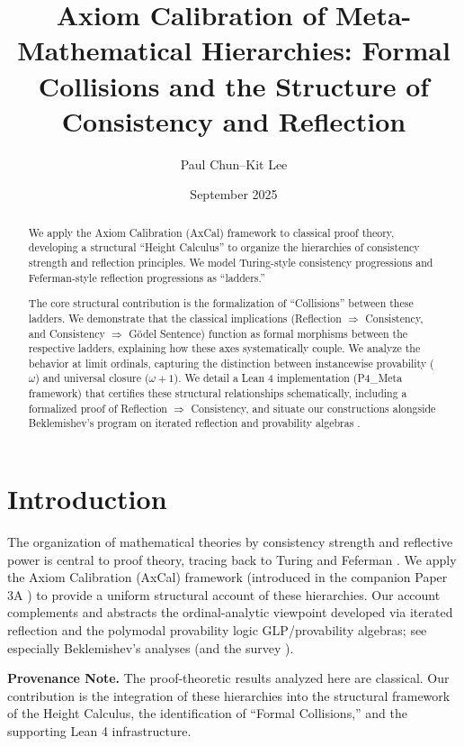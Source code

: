 \documentclass[11pt]{article}
\title{Axiom Calibration of Meta-Mathematical Hierarchies: Formal Collisions and the Structure of Consistency and Reflection}
\author{Paul Chun--Kit Lee}
\date{September 2025}
\begin{document}
\maketitle

\begin{abstract}
We apply the Axiom Calibration (AxCal) framework to classical proof theory, developing a structural ``Height Calculus'' to organize the hierarchies of consistency strength and reflection principles. We model Turing-style consistency progressions and Feferman-style reflection progressions as ``ladders.''

The core structural contribution is the formalization of ``Collisions'' between these ladders. We demonstrate that the classical implications (Reflection $\Rightarrow$ Consistency, and Consistency $\Rightarrow$ Gödel Sentence) function as formal morphisms between the respective ladders, explaining how these axes systematically couple. We analyze the behavior at limit ordinals, capturing the distinction between instancewise provability ($\omega$) and universal closure ($\omega+1$). We detail a Lean 4 implementation (P4\_Meta framework) that certifies these structural relationships schematically, including a formalized proof of Reflection $\Rightarrow$ Consistency, and situate our constructions alongside Beklemishev’s program on iterated reflection and provability algebras \cite{Beklemishev2003,Beklemishev2004}.
\end{abstract}

\tableofcontents

\section{Introduction}
The organization of mathematical theories by consistency strength and reflective power is central to proof theory, tracing back to Turing \cite{Turing1939} and Feferman \cite{Feferman1962}. We apply the Axiom Calibration (AxCal) framework (introduced in the companion Paper 3A \cite{Paper3a}) to provide a uniform structural account of these hierarchies.
Our account complements and abstracts the ordinal-analytic viewpoint developed via iterated reflection and the polymodal provability logic GLP/provability algebras; see especially Beklemishev’s analyses \cite{Beklemishev2003,Beklemishev2004} (and the survey \cite{ArtemovBeklemishev2004}).

\begin{mdframed}[style=provenance]
\textbf{Provenance Note.} The proof-theoretic results analyzed here are classical. Our contribution is the integration of these hierarchies into the structural framework of the Height Calculus, the identification of ``Formal Collisions,'' and the supporting Lean 4 infrastructure.
\end{mdframed}
\end{document}
